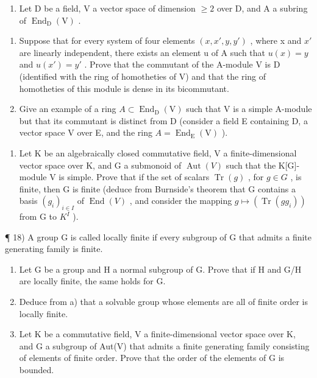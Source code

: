 \begin{enumerate}
\def\labelenumi{\arabic{enumi})}
\setcounter{enumi}{15}
\tightlist
\item
  Let D be a field, V a vector space of dimension \(\geqslant 2\) over D, and A a subring of \(\operatorname{End}_{\mathrm{D}}(\mathrm{V})\) .
\end{enumerate}

\begin{enumerate}
\def\labelenumi{\alph{enumi})}
\item
  Suppose that for every system of four elements \((x, x', y, y')\) , where x and \(x'\) are linearly independent, there exists an element u of A such that \(u(x) = y\) and \(u(x') = y'\) . Prove that the commutant of the A-module V is D (identified with the ring of homotheties of V) and that the ring of homotheties of this module is dense in its bicommutant.
\item
  Give an example of a ring \(A \subset \operatorname{End}_{\mathrm{D}}(\mathrm{V})\) such that V is a simple A-module but that its commutant is distinct from D (consider a field E containing D, a vector space V over E, and the ring \(A = \operatorname{End}_{\mathrm{E}}(\mathrm{V})\) ).
\end{enumerate}

\begin{enumerate}
\def\labelenumi{\arabic{enumi})}
\setcounter{enumi}{16}
\tightlist
\item
  Let K be an algebraically closed commutative field, V a finite-dimensional vector space over K, and G a submonoid of \(\operatorname{Aut}(V)\) such that the K{[}G{]}-module V is simple. Prove that if the set of scalars \(\operatorname{Tr}(g)\) , for \(g \in G\) , is finite, then G is finite (deduce from Burnside's theorem that G contains a basis \((g_{i})_{i \in I}\) of \(\operatorname{End}(V)\) , and consider the mapping \(g \mapsto (\operatorname{Tr}(gg_{i}))\) from G to \(K^{I}\) ).
\end{enumerate}

¶ 18) A group G is called locally finite if every subgroup of G that admits a finite generating family is finite.

\begin{enumerate}
\def\labelenumi{\alph{enumi})}
\item
  Let G be a group and H a normal subgroup of G. Prove that if H and G/H are locally finite, the same holds for G.
\item
  Deduce from a) that a solvable group whose elements are all of finite order is locally finite.
\item
  Let K be a commutative field, V a finite-dimensional vector space over K, and G a subgroup of Aut(V) that admits a finite generating family consisting of elements of finite order. Prove that the order of the elements of G is bounded.
\end{enumerate}

